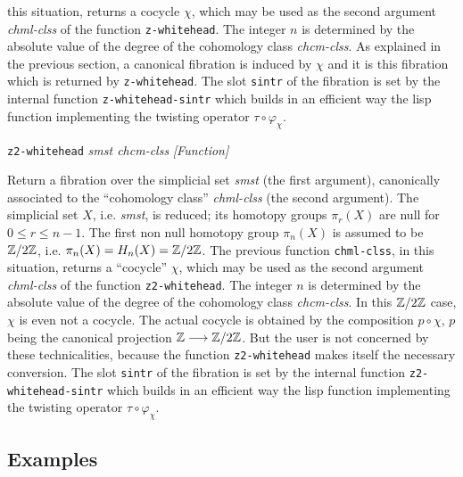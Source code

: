 {{this situation, returns a cocycle $\chi$, which may be used as the second argument {\em chml-clss} of the function
{\tt z-whitehead}. The integer  $n$ is determined by the absolute value of the degree of the
cohomology class {\em chcm-clss}. As explained in the previous section, a canonical fibration
is induced by $\chi$ and it is this fibration which is returned by {\tt z-whitehead}. The slot {\tt sintr} of the
fibration is set by the internal function {\tt z-whitehead-sintr} which builds
in an efficient way the lisp function implementing the twisting operator $\tau \circ \varphi_\chi$.
\par}
{\leftskip=5mm
{\tt z2-whitehead} {\em smst chcm-clss}  \hfill {\em [Function]} \par}
{\leftskip=15mm
Return a fibration  over the simplicial set {\em smst} (the first argument), canonically associated
to the ``cohomology class'' {\em chml-clss} (the second argument). The simplicial set $X$, i.e. {\em smst}, is
reduced; its homotopy groups $\pi_r(X)$ are null for $0 \leq r \leq n-1$. The first non null homotopy group
$\pi_n(X)$ is assumed to be ${\mathbb{Z}}/2{\mathbb{Z}}$, i.e. $\pi_n(X)= H_n(X)= {\mathbb{Z}}/2{\mathbb{Z}}$. The previous function {\tt chml-clss}, in
this situation, returns a ``cocycle'' $\chi$, which may be used as the second argument {\em chml-clss} of the function
{\tt z2-whitehead}. The integer $n$ is determined by the absolute value of the degree of the
cohomology class {\em chcm-clss}. In this ${\mathbb{Z}}/2{\mathbb{Z}}$ case, $\chi$ is even not a cocycle. The actual cocycle is
obtained by the composition $p \circ \chi$, $p$ being the canonical projection
${\mathbb{Z}} \longrightarrow {\mathbb{Z}}/{2 {\mathbb{Z}}}$. But the user is not concerned by these technicalities, because the function
{\tt z2-whitehead} makes itself the necessary conversion. The slot {\tt sintr} of the
fibration is set by the internal function {\tt z2-whitehead-sintr} which builds
in an efficient way the lisp function implementing the twisting operator $\tau \circ \varphi_\chi$.
\par}
}

\subsection* {Examples}

